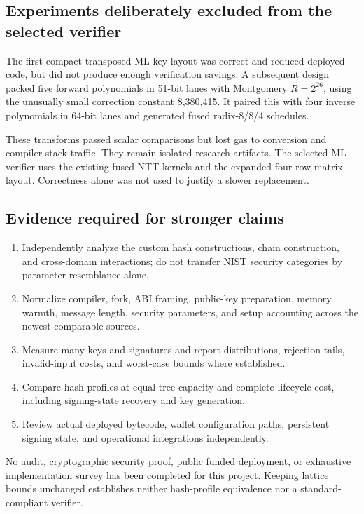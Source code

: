 \documentclass[11pt,a4paper]{article}
\begin{document}
\subsection{Experiments deliberately excluded from the selected verifier}
The first compact transposed ML key layout was correct and reduced deployed
code, but did not produce enough verification savings. A subsequent design
packed five forward polynomials in 51-bit lanes with Montgomery
$R=2^{26}$, using the unusually small correction constant 8,380,415. It paired
this with four inverse polynomials in 64-bit lanes and generated fused
radix-8/8/4 schedules.

These transforms passed scalar comparisons but lost gas to conversion and
compiler stack traffic. They remain isolated research artifacts. The selected
ML verifier uses the existing fused NTT kernels and the expanded four-row
matrix layout. Correctness alone was not used to justify a slower replacement.

\subsection{Evidence required for stronger claims}
\begin{enumerate}
\item Independently analyze the custom hash constructions, chain construction,
and cross-domain interactions; do not transfer NIST security categories by
parameter resemblance alone.
\item Normalize compiler, fork, ABI framing, public-key preparation, memory
warmth, message length, security parameters, and setup accounting across
the newest comparable sources.
\item Measure many keys and signatures and report distributions, rejection
tails, invalid-input costs, and worst-case bounds where established.
\item Compare hash profiles at equal tree capacity and complete lifecycle
cost, including signing-state recovery and key generation.
\item Review actual deployed bytecode, wallet configuration paths, persistent
signing state, and operational integrations independently.
\end{enumerate}
No audit, cryptographic security proof, public funded deployment, or exhaustive
implementation survey has been completed for this project. Keeping lattice
bounds unchanged establishes neither hash-profile equivalence nor a
standard-compliant verifier.
\end{document}
